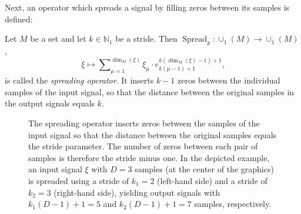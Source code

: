 \documentclass[journal]{IEEEtran}
\newcommand{\N}{\mathbb{N}}
\DeclareMathOperator{\Spreading}{Spread}
\begin{document}
Next, an operator which spreads a signal by filling zeros between its samples is defined:
\begin{definition}
\label{def:spreading}
Let $M$ be a set and let $k\in\N_1$ be a stride.
Then $\Spreading_k\colon\cup_1(M) \to \cup_1(M)$,
\begin{displaymath}
  \xi\mapsto \sum\nolimits_{\mu = 1}^{\dim_M(\xi)} \xi_{\mu}\cdot e_{k(\mu - 1) + 1}^{k(\dim_M(\xi) - 1) + 1}\text{,}
\end{displaymath}
is called the \emph{spreading operator}.
It inserts $k - 1$ zeros between the individual samples of the input signal, so that the distance between the original samples in the output signals equals $k$.
\end{definition}\begin{figure}[t]
  \centering
  \caption{The spreading operator inserts zeros between the samples of the input signal so that the distance between the original samples equals the stride parameter.
    The number of zeros between each pair of samples is therefore the stride minus one.
    In the depicted example, an input signal $\xi$ with $D = 3$ samples (at the center of the graphics) is spreaded using a stride of $k_1 = 2$ (left-hand side) and a stride of $k_2 = 3$ (right-hand side), yielding output signals with $k_1 (D - 1) + 1 = 5$ and $k_2 (D - 1) + 1 = 7$ samples, respectively.}
  \label{fig:spreading}
\end{figure}
\end{document}
